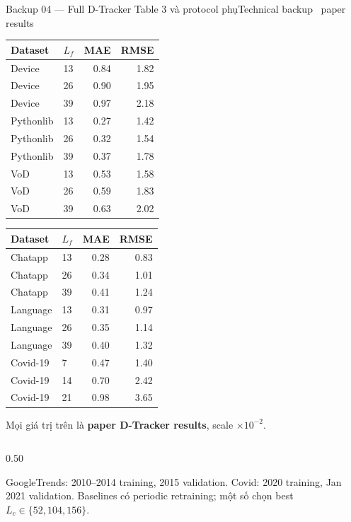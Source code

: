 \documentclass[aspectratio=169,11pt]{beamer}
\begin{document}
\begin{frame}[shrink=24]{Backup 04 --- Full D-Tracker Table 3 và protocol phụ}{Technical backup \textperiodcentered\ paper results}
\centering
{\fontsize{7.2}{8.3}\selectfont
\begin{tabular}{@{}llrr@{}}
  \toprule
  Dataset & $L_f$ & MAE & RMSE\\
  \midrule
  Device & 13 & 0.84 & 1.82\\
  Device & 26 & 0.90 & 1.95\\
  Device & 39 & 0.97 & 2.18\\
  Pythonlib & 13 & 0.27 & 1.42\\
  Pythonlib & 26 & 0.32 & 1.54\\
  Pythonlib & 39 & 0.37 & 1.78\\
  VoD & 13 & 0.53 & 1.58\\
  VoD & 26 & 0.59 & 1.83\\
  VoD & 39 & 0.63 & 2.02\\
  \bottomrule
\end{tabular}\qquad
\begin{tabular}{@{}llrr@{}}
  \toprule
  Dataset & $L_f$ & MAE & RMSE\\
  \midrule
  Chatapp & 13 & 0.28 & 0.83\\
  Chatapp & 26 & 0.34 & 1.01\\
  Chatapp & 39 & 0.41 & 1.24\\
  Language & 13 & 0.31 & 0.97\\
  Language & 26 & 0.35 & 1.14\\
  Language & 39 & 0.40 & 1.32\\
  Covid-19 & 7 & 0.47 & 1.40\\
  Covid-19 & 14 & 0.70 & 2.42\\
  Covid-19 & 21 & 0.98 & 3.65\\
  \bottomrule
\end{tabular}}
\vspace{3mm}
{\small Mọi giá trị trên là \textbf{paper D-Tracker results}, scale $\times10^{-2}$.}
\vspace{3mm}
\begin{columns}[T,onlytextwidth]
\begin{column}{0.50\textwidth}
\begin{intuition}
  GoogleTrends: 2010--2014 training, 2015 validation. Covid: 2020 training, Jan 2021 validation. Baselines có periodic retraining; một số chọn best $L_c\in\{52,104,156\}$.

\end{intuition}
\end{column}
\end{columns}
\end{frame}
\end{document}
